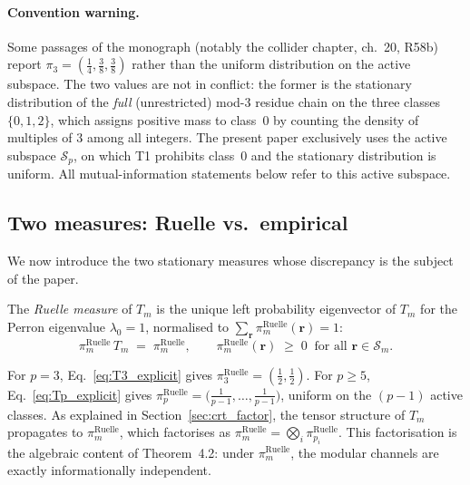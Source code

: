 \paragraph{Convention warning.}
Some passages of the monograph (notably the
collider chapter, ch.~20, R58b) report
$\pi_3 = (\tfrac14, \tfrac38, \tfrac38)$ rather than the uniform
distribution on the active subspace. The two values are not in
conflict: the former is the stationary distribution of the
\emph{full} (unrestricted) mod-$3$ residue chain on the three classes
$\{0, 1, 2\}$, which assigns positive mass to class~$0$ by counting the
density of multiples of $3$ among all integers. The present paper
exclusively uses the active subspace $\mathcal{S}_p$, on which T1
prohibits class~$0$ and the stationary distribution is uniform. All
mutual-information statements below refer to this active subspace.

\subsection{Two measures: Ruelle vs.\ empirical}
\label{ssec:two_measures}

We now introduce the two stationary measures whose discrepancy is the
subject of the paper.

\begin{definition}
\label{def:pi_ruelle}
The \emph{Ruelle measure} of $T_m$ is the unique left probability
eigenvector of $T_m$ for the Perron eigenvalue $\lambda_0 = 1$,
normalised to $\sum_{\mathbf{r}} \pi_m^{\mathrm{Ruelle}}(\mathbf{r}) = 1$:
\begin{equation}
  \pi_m^{\mathrm{Ruelle}}\, T_m \;=\; \pi_m^{\mathrm{Ruelle}},
  \qquad
  \pi_m^{\mathrm{Ruelle}}(\mathbf{r}) \;\geq\; 0
  \;\;\text{for all } \mathbf{r} \in \mathcal{S}_m.
  \label{eq:pi_ruelle_def}
\end{equation}
\end{definition}

\noindent
For $p = 3$, Eq.~\eqref{eq:T3_explicit} gives
$\pi_3^{\mathrm{Ruelle}} = (\tfrac12, \tfrac12)$. For $p \geq 5$,
Eq.~\eqref{eq:Tp_explicit} gives
$\pi_p^{\mathrm{Ruelle}} = \bigl(\tfrac{1}{p-1}, \ldots, \tfrac{1}{p-1}\bigr)$,
uniform on the $(p-1)$ active classes. As explained in
Section~\ref{sec:crt_factor}, the tensor structure of $T_m$ propagates
to $\pi_m^{\mathrm{Ruelle}}$, which factorises as
$\pi_m^{\mathrm{Ruelle}} = \bigotimes_i \pi_{p_i}^{\mathrm{Ruelle}}$.
This factorisation is the algebraic content of Theorem~4.2: under
$\pi_m^{\mathrm{Ruelle}}$, the modular channels are exactly
informationally independent.

